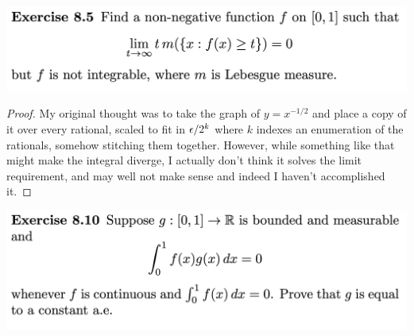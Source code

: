 \newpage
\begin{mdframed}
\includegraphics[width=400pt]{img/analysis--berkeley-202a-hw09-b0e8.png}
\end{mdframed}



\begin{proof}
  My original thought was to take the graph of $y = x^{-1/2}$ and place a copy of it over every rational,
  scaled to fit in $\epsilon/2^k$ where $k$ indexes an enumeration of the rationals, somehow stitching them
  together. However, while something like that might make the integral diverge, I actually don't think it
  solves the limit requirement, and may well not make sense and indeed I haven't accomplished it.
\end{proof}
\newpage

\begin{mdframed}
\includegraphics[width=400pt]{img/analysis--berkeley-202a-hw09-113a.png}
\end{mdframed}

